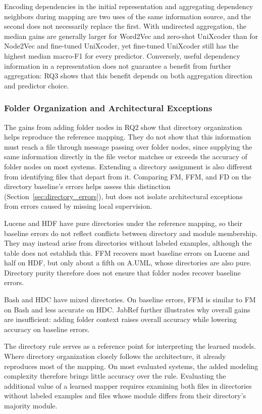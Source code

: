 Encoding dependencies in the initial representation and aggregating dependency neighbors during mapping are two uses of the same information source, and the second does not necessarily replace the first. With undirected aggregation, the median gains are generally larger for Word2Vec and zero-shot UniXcoder than for Node2Vec and fine-tuned UniXcoder, yet fine-tuned UniXcoder still has the highest median macro-F1 for every predictor. Conversely, useful dependency information in a representation does not guarantee a benefit from further aggregation: RQ3 shows that this benefit depends on both aggregation direction and predictor choice.

\subsubsection*{Folder Organization and Architectural Exceptions}
The gains from adding folder nodes in RQ2 show that directory organization helps reproduce the reference mapping. They do not show that this information must reach a file through message passing over folder nodes, since supplying the same information directly in the file vector matches or exceeds the accuracy of folder nodes on most systems. Extending a directory assignment is also different from identifying files that depart from it. Comparing FM, FFM, and FD on the directory baseline's errors helps assess this distinction (Section~\ref{sec:directory_errors}), but does not isolate architectural exceptions from errors caused by missing local supervision.

Lucene and HDF have pure directories under the reference mapping, so their baseline errors do not reflect conflicts between directory and module membership. They may instead arise from directories without labeled examples, although the table does not establish this. FFM recovers most baseline errors on Lucene and half on HDF, but only about a fifth on A.UML, whose directories are also pure. Directory purity therefore does not ensure that folder nodes recover baseline errors.

Bash and HDC have mixed directories. On baseline errors, FFM is similar to FM on Bash and less accurate on HDC. JabRef further illustrates why overall gains are insufficient: adding folder context raises overall accuracy while lowering accuracy on baseline errors.

The directory rule serves as a reference point for interpreting the learned models. Where directory organization closely follows the architecture, it already reproduces most of the mapping. On most evaluated systems, the added modeling complexity therefore brings little accuracy over the rule. Evaluating the additional value of a learned mapper requires examining both files in directories without labeled examples and files whose module differs from their directory's majority module.

